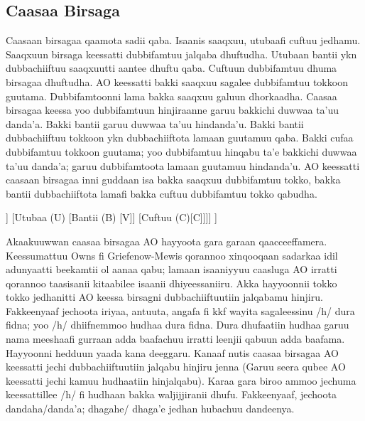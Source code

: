 \documentclass[11pt,b5paper]{book}
\begin{document}
\begin{itemize}
\subsection{Caasaa Birsaga}
\setlength{\parindent}{3em}

Caasaan birsagaa qaamota sadii qaba. Isaanis saaqxuu,  utubaafi cuftuu jedhamu. Saaqxuun birsaga keessatti  dubbifamtuu jalqaba dhuftudha. Utubaan bantii ykn  dubbachiiftuu saaqxuutti aantee dhuftu qaba. Cuftuun  dubbifamtuu dhuma birsagaa dhuftudha. AO keessatti bakki  saaqxuu sagalee dubbifamtuu tokkoon guutama.  Dubbifamtoonni lama bakka saaqxuu galuun dhorkaadha.  Caasaa birsagaa keessa yoo dubbifamtuun hinjiraanne garuu  bakkichi duwwaa ta’uu danda’a. Bakki bantii garuu duwwaa  ta’uu hindanda’u. Bakki bantii dubbachiiftuu tokkoon ykn  dubbachiiftota lamaan guutamuu qaba. Bakki cufaa  dubbifamtuu tokkoon guutama; yoo dubbifamtuu hinqabu ta’e  bakkichi duwwaa ta’uu danda’a; garuu dubbifamtoota lamaan  guutamuu hindanda’u. AO keessatti caasaan birsagaa inni guddaan isa bakka saaqxuu dubbifamtuu tokko, bakka bantii dubbachiiftota lamafi bakka cuftuu dubbifamtuu tokko qabudha. 

\begin{forest}
	[Birsaga  [Saaqxuu (S) [C]] [Utubaa (U) [Bantii (B) [V]] [Cuftuu (C)[C]]]]
	]
\end{forest}  

Akaakuuwwan caasaa birsagaa AO hayyoota gara garaan qaacceeffamera\cite{Addunya2018,griefenow2001grammatical,gragg1976oromo}. Keessumattuu Owns fi Griefenow-Mewis  qorannoo xinqooqaan sadarkaa idil adunyaatti beekamtii ol  aanaa qabu; lamaan isaaniyyuu caasluga AO irratti qorannoo  taasisanii kitaabilee isaanii dhiyeessaniiru. Akka hayyoonnii tokko tokko jedhanitti\cite{griefenow2001grammatical} AO keessa birsagni  dubbachiiftuutiin jalqabamu hinjiru. Fakkeenyaaf jechoota  iriyaa, antuuta, angafa fi kkf wayita sagaleessinu /h/ dura  fidna; yoo /h/ dhiifnemmoo hudhaa dura fidna. Dura dhufaatiin  hudhaa garuu nama meeshaafi gurraan adda baafachuu irratti  leenjii qabuun adda baafama. Hayyoonni hedduun yaada kana  deeggaru. Kanaaf nutis caasaa birsagaa AO keessatti jechi  dubbachiiftuutiin jalqabu hinjiru jenna (Garuu seera qubee AO  keessatti jechi kamuu hudhaatiin hinjalqabu). Karaa gara biroo  ammoo jechuma keessattillee /h/ fi hudhaan bakka waljijjiranii  dhufu. Fakkeenyaaf, jechoota dandaha/danda’a; dhagahe/ dhaga’e jedhan hubachuu dandeenya\cite{griefenow2001grammatical}. 


\end{itemize}
\end{document}
